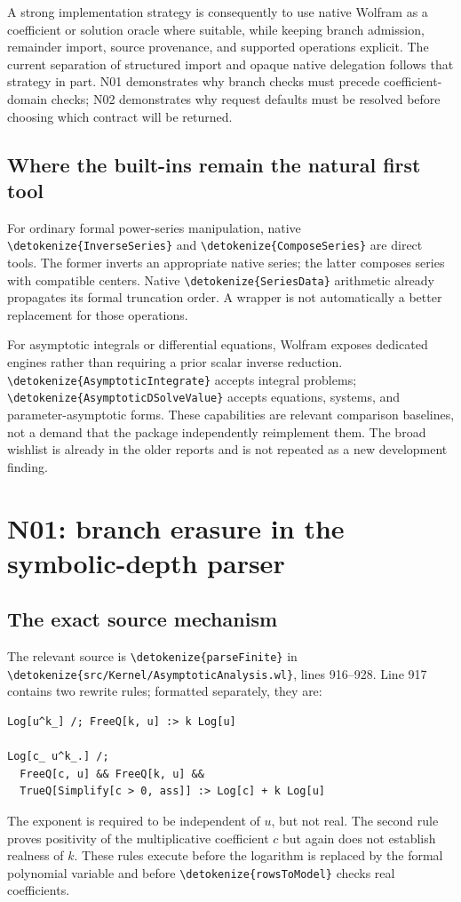 \documentclass[11pt,a4paper]{article}
\newcommand{\wl}[1]{\texttt{\expandafter\nolinkurl\expandafter{\detokenize{#1}}}}
\begin{document}
A strong implementation strategy is consequently to use native Wolfram as a
coefficient or solution oracle where suitable, while keeping branch admission,
remainder import, source provenance, and supported operations explicit. The
current separation of structured import and opaque native delegation follows
that strategy in part. N01 demonstrates why branch checks must precede
coefficient-domain checks; N02 demonstrates why request defaults must be resolved
before choosing which contract will be returned.\cite{native,nativespecial,core}

\subsection{Where the built-ins remain the natural first tool}

For ordinary formal power-series manipulation, native \wl{InverseSeries} and
\wl{ComposeSeries} are direct tools. The former inverts an appropriate native
series; the latter composes series with compatible centers. Native
\wl{SeriesData} arithmetic already propagates its formal truncation order.
A wrapper is not automatically a better replacement for those operations.
\cite{wlinverseseries,wlcompose,wlseriesdata}

For asymptotic integrals or differential equations, Wolfram exposes dedicated
engines rather than requiring a prior scalar inverse reduction.
\wl{AsymptoticIntegrate} accepts integral problems; \wl{AsymptoticDSolveValue}
accepts equations, systems, and parameter-asymptotic forms. These capabilities
are relevant comparison baselines, not a demand that the package independently
reimplement them. The broad wishlist is already in the older reports and is not
repeated as a new development finding.\cite{wlasymintegrate,wlasymdsolve,status}

\section{N01: branch erasure in the symbolic-depth parser}\label{sec:winding}

\subsection{The exact source mechanism}

The relevant source is \wl{parseFinite} in
\wl{src/Kernel/AsymptoticAnalysis.wl}, lines 916--928. Line 917 contains two
rewrite rules; formatted separately, they are:
\begin{lstlisting}
Log[u^k_] /; FreeQ[k, u] :> k Log[u]

Log[c_ u^k_.] /;
  FreeQ[c, u] && FreeQ[k, u] &&
  TrueQ[Simplify[c > 0, ass]] :> Log[c] + k Log[u]
\end{lstlisting}
The exponent is required to be independent of $u$, but not real. The second
rule proves positivity of the multiplicative coefficient $c$ but again does
not establish realness of $k$. These rules execute before the logarithm is
replaced by the formal polynomial variable and before
\wl{rowsToModel} checks real coefficients.\cite{core}
\end{document}
